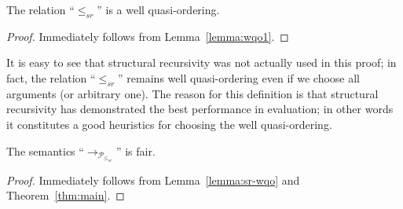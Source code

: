 \begin{lemma}
\label{lemma:sr-wqo}
The relation ``$\leq_{sr}$'' is a well quasi-ordering.
\end{lemma}
\begin{proof}
  Immediately follows from Lemma~\ref{lemma:wqo1}.
\end{proof}

It is easy to see that structural recursivity was not actually used in this proof; in fact, the relation ``$\leq_{sr}$'' remains well quasi-ordering even if we choose all arguments (or
arbitrary one). The reason for this definition is that structural recursivity has demonstrated the best performance in evaluation; in other words it constitutes a good
heuristics for choosing the well quasi-ordering.

\begin{corollary}
  The semantics ``$\rightarrow_{\mathcal{P}_{\leq_{sr}}}$'' is fair.
\end{corollary}
\begin{proof}
  Immediately follows from Lemma~\ref{lemma:sr-wqo} and Theorem~\ref{thm:main}.
\end{proof}
